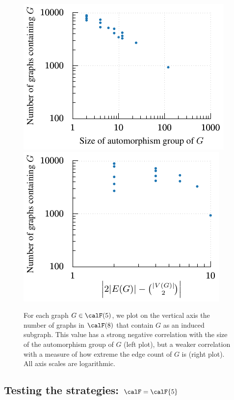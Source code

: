 \begin{figure}[htb]
    \centering

      \includegraphics*{15-universal-graphs/img/automorphisms-scatter.pdf}
     \qquad
      \includegraphics*{15-universal-graphs/img/deg-scatter.pdf}
    \caption{For each graph $G \in \calF(5)$, we plot on the vertical axis
    the number of graphs in $\calF(8)$ that contain $G$ as an induced subgraph.
    This value has a strong negative correlation with the size of the automorphism
    group of $G$ (left plot), but a weaker correlation with a measure of how
    extreme the edge count of $G$ is (right plot).
    All axis scales are logarithmic.}
\label{fig:scatter}
\end{figure}

\subsection{Testing the strategies: $\calF = \calF{5}$}

